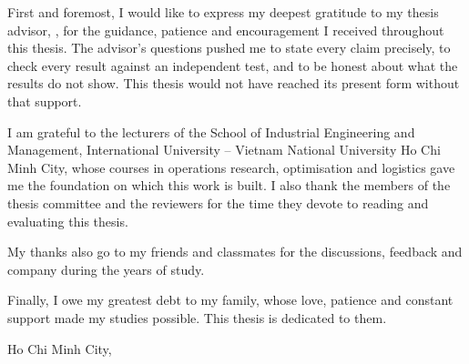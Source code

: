 
First and foremost, I would like to express my deepest gratitude to my
thesis advisor, \advisorname, for the guidance, patience and encouragement
I received throughout this thesis. The advisor's questions pushed me to
state every claim precisely, to check every result against an independent
test, and to be honest about what the results do not show. This thesis
would not have reached its present form without that support.

I am grateful to the lecturers of the School of Industrial Engineering and
Management, International University -- Vietnam National University Ho Chi
Minh City, whose courses in operations research, optimisation and logistics
gave me the foundation on which this work is built. I also thank the
members of the thesis committee and the reviewers for the time they devote
to reading and evaluating this thesis.

My thanks also go to my friends and classmates for the discussions,
feedback and company during the years of study.

Finally, I owe my greatest debt to my family, whose love, patience and
constant support made my studies possible. This thesis is dedicated to them.

\vspace{1cm}
\noindent Ho Chi Minh City, \thesisdate\par
\noindent \studentname
